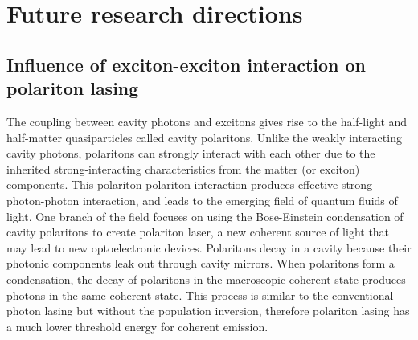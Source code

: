  




\section{Future research directions}

\subsection{Influence of exciton-exciton interaction on polariton lasing}
The coupling between cavity photons and excitons gives rise to the half-light and half-matter quasiparticles called 
cavity polaritons\cite{kavokin2007}. Unlike the weakly interacting cavity photons, polaritons can strongly interact with each 
other due to the inherited strong-interacting characteristics from the matter (or exciton) components. This polariton-polariton
interaction produces effective strong photon-photon interaction, and leads to the emerging field of quantum fluids of
 light\cite{carusotto2013}. One branch of the field focuses on using the  Bose-Einstein condensation of cavity polaritons to create
 polariton laser, a new coherent source of light that may lead to new optoelectronic devices\cite{pavlos2014}. 
 Polaritons decay in a cavity because their photonic components leak out through 
 cavity mirrors. When polaritons form a condensation, the decay of polaritons in the  macroscopic coherent state produces
 photons in the same coherent state. This process is similar to the conventional photon lasing but without the population
 inversion, therefore polariton lasing has a much lower threshold energy for coherent emission\cite{daskalakis2003}. 

